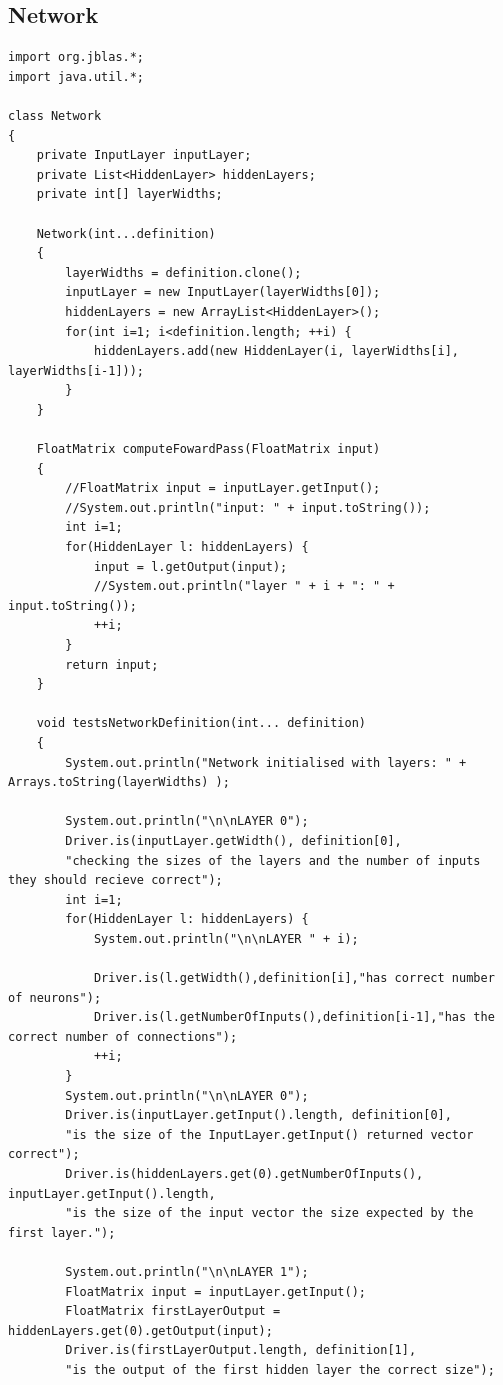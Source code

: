 \documentclass[11pt]{article} %
\begin{document}
\subsection{Network}
\begin{lstlisting}
import org.jblas.*;
import java.util.*;

class Network
{
    private InputLayer inputLayer;
    private List<HiddenLayer> hiddenLayers;
    private int[] layerWidths;
        
    Network(int...definition)
    {
        layerWidths = definition.clone();
        inputLayer = new InputLayer(layerWidths[0]);
        hiddenLayers = new ArrayList<HiddenLayer>();
        for(int i=1; i<definition.length; ++i) {
            hiddenLayers.add(new HiddenLayer(i, layerWidths[i], layerWidths[i-1]));
        }
    }
    
    FloatMatrix computeFowardPass(FloatMatrix input)
    {
        //FloatMatrix input = inputLayer.getInput();
        //System.out.println("input: " + input.toString());
        int i=1;
        for(HiddenLayer l: hiddenLayers) {
            input = l.getOutput(input);
            //System.out.println("layer " + i + ": " + input.toString());
            ++i;
        }
        return input;
    }
    
    void testsNetworkDefinition(int... definition)
    {
        System.out.println("Network initialised with layers: " + Arrays.toString(layerWidths) );
       
        System.out.println("\n\nLAYER 0");
        Driver.is(inputLayer.getWidth(), definition[0],
        "checking the sizes of the layers and the number of inputs they should recieve correct");
        int i=1;
        for(HiddenLayer l: hiddenLayers) {
            System.out.println("\n\nLAYER " + i);

            Driver.is(l.getWidth(),definition[i],"has correct number of neurons");
            Driver.is(l.getNumberOfInputs(),definition[i-1],"has the correct number of connections");
            ++i;
        }
        System.out.println("\n\nLAYER 0");
        Driver.is(inputLayer.getInput().length, definition[0],
        "is the size of the InputLayer.getInput() returned vector correct");
        Driver.is(hiddenLayers.get(0).getNumberOfInputs(), inputLayer.getInput().length,
        "is the size of the input vector the size expected by the first layer.");
        
        System.out.println("\n\nLAYER 1");
        FloatMatrix input = inputLayer.getInput();
        FloatMatrix firstLayerOutput = hiddenLayers.get(0).getOutput(input);
        Driver.is(firstLayerOutput.length, definition[1],
        "is the output of the first hidden layer the correct size");
        

\end{lstlisting}
\end{document}
